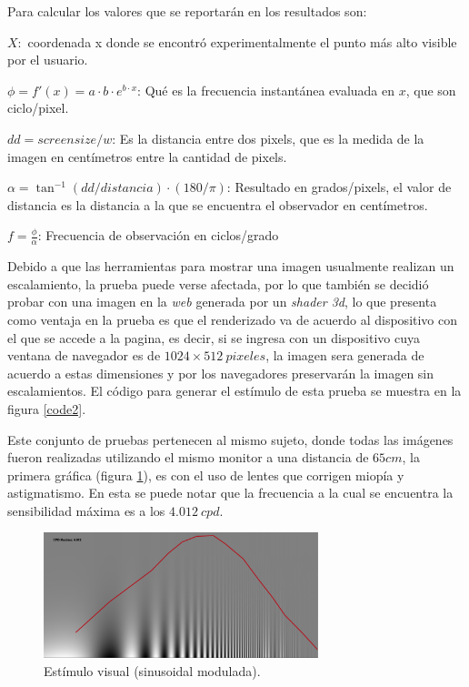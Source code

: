 \documentclass[conference]{IEEEtran}
\def\shadowLine{\vspace{3mm}}
\begin{document}
Para calcular los valores que se reportarán en los resultados son:

$X:$ coordenada x donde se encontró experimentalmente el punto más alto visible por el usuario.

$\phi=f'(x)= a\cdot b\cdot e^{b\cdot x}$: Qué es la frecuencia instantánea evaluada en $x$, que son ciclo/pixel.

$dd = screensize/w$: Es la distancia entre dos pixels, que es la medida de la imagen en centímetros entre la cantidad de pixels.

$\alpha= \tan^{-1}(dd/distancia)\cdot (180/\pi)$: Resultado en grados/pixels, el valor de distancia es la distancia a la que se encuentra el observador en centímetros.

\shadowLine
$f=\displaystyle\frac{\phi}{\alpha}$: Frecuencia de observación en ciclos/grado


Debido a que las herramientas para mostrar una imagen usualmente realizan un
escalamiento, la prueba puede verse afectada, por lo que también se decidió probar con una imagen en la \textit{web} generada por un \textit{shader 3d}, lo que
presenta como ventaja en la prueba es que el renderizado va de acuerdo al dispositivo
con el que se accede a la pagina, es decir, si se ingresa con un dispositivo
cuya ventana de navegador es de $1024 \times 512\ pixeles$, la imagen sera generada de
acuerdo a estas dimensiones y por los navegadores preservarán la imagen sin escalamientos. El código para generar el estímulo de esta prueba se muestra en la figura \ref{code2}.


Este conjunto de pruebas pertenecen al mismo sujeto, donde todas las imágenes fueron
realizadas utilizando el mismo monitor a una distancia de $65cm$, la primera
gráfica (figura \ref{normal}), es con el uso de lentes que corrigen miopía y astigmatismo.
En esta se puede notar que la frecuencia a la cual se encuentra la sensibilidad
máxima es a los $4.012\ cpd$.

\begin{figure}[htbp]
\centerline{\includegraphics[width=80mm]{code/Normal}}
\caption{Estímulo visual (sinusoidal modulada).}
\label{normal}
\end{figure}
\end{document}
